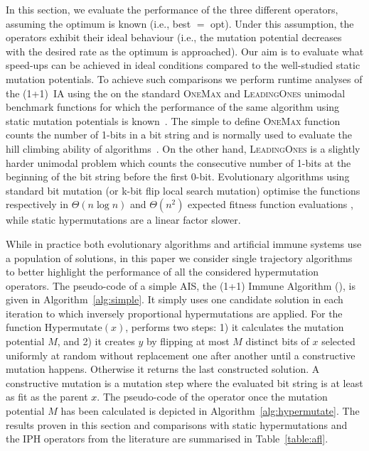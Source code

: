 \documentclass[lettersize,journal]{IEEEtran}
\newcommand{\new}[1]{\textcolor{black}{#1}}
\begin{document}
In this section, we evaluate the performance of the three different \IPHfcm{} operators, %
assuming the optimum is known (i.e., best $=$ opt). Under this assumption, the operators exhibit their ideal behaviour (i.e., the mutation potential decreases with the desired rate as the optimum is approached).
Our aim is to evaluate what speed-ups can be achieved in ideal conditions compared to the well-studied static mutation potentials. To achieve such comparisons we perform runtime analyses of the (1+1)~IA  using the \IPHfcm{} on the standard \textsc{OneMax} and \textsc{LeadingOnes} unimodal benchmark functions for which the performance of the same algorithm using static mutation potentials is known~\cite{CorusOlivetoYazdani2019TCS}. The simple to define \textsc{OneMax} function counts the number of 1-bits in \new{a} bit string and is normally used to evaluate the hill climbing ability of algorithms~\cite{LehrTEVC2018,CorusOlivetoTEVCsteadyGA2017,CorusOlivetoAlgo2020,DoerrDoerrEbel2015}. On the other hand, \textsc{LeadingOnes} is a slightly harder unimodal problem which counts the consecutive number of 1-bits at the beginning of the bit string before the first 0-bit. 
Evolutionary algorithms using standard bit mutation (or k-bit flip local search mutation) optimise the functions respectively in $\Theta(n \log n)$ and $\Theta(n^2)$ expected fitness function evaluations \cite{DrosteJansenWegener2002,BoettcherEtAl2010,DoerrEtAl2016B,LissovoiOlivetoWarwicker2020,DLOW2018}, while static hypermutations are a linear factor slower\cite{CorusOlivetoYazdani2019TCS}.

While in practice both evolutionary algorithms and artificial immune systems use a population of solutions, in this paper we consider single trajectory algorithms to better highlight the performance of all the considered hypermutation operators.
The pseudo-code of a simple AIS,  the (1+1) Immune Algorithm (\oneoneIA{}), is given in Algorithm~\ref{alg:simple}. It simply uses one candidate solution in each iteration to which inversely proportional hypermutations are applied. For the function Hypermutate$(x)$, \IPHfcm{} performs two steps: 
1) it calculates the mutation potential $M$, and 2) it creates $y$ by flipping at most $M$ distinct bits of $x$ selected uniformly at random without replacement one after another until a constructive mutation happens. Otherwise it returns the last constructed solution. A  constructive mutation is a mutation step where the evaluated bit string is at least as fit as the parent \new{$x$}. The pseudo-code of the operator once the mutation potential $M$ has been calculated is depicted in Algorithm~\ref{alg:hypermutate}.
%
The results proven in this section and comparisons with static hypermutations and the IPH operators from the literature are summarised in Table~\ref{table:afl}.
\end{document}
